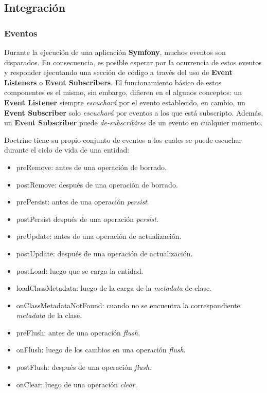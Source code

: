 \subsection{Integración}

\subsubsection{Eventos}%
\label{ssub:eventos}


Durante la ejecución de una aplicación \textbf{Symfony}, muchos eventos son disparados\@. En consecuencia, es posible esperar por la ocurrencia de estos eventos y responder ejecutando
una sección de código a través del uso de \textbf{Event Listeners} o \textbf{Event Subscribers}\@. El funcionamiento básico de estos componentes es el mismo, sin embargo, difieren en
el algunos conceptos: un \textbf{Event Listener} siempre \textit{escuchará} por el evento establecido, en cambio, un \textbf{Event Subscriber} solo \textit{escuchará} por eventos a los
que está subscripto\@. Además, un \textbf{Event Subscriber} puede \textit{de-subscribirse} de un evento en cualquier momento.


Doctrine tiene su propio conjunto de eventos a los cuales se puede escuchar durante el ciclo de vida de una entidad:

\begin{itemize}
    \item preRemove: antes de una operación de borrado.
    \item postRemove: después de una operación de borrado.
    \item prePersist: antes de una operación \textit{persist}.
    \item postPersist después de una operación \textit{persist}.
    \item preUpdate: antes de una operación de actualización.
    \item postUpdate: después de una operación de actualización.
    \item postLoad: luego que se carga la entidad.
    \item loadClassMetadata: luego de la carga de la \textit{metadata} de clase.
    \item onClassMetadataNotFound: cuando no se encuentra la correspondiente \textit{metadata} de la clase.
    \item preFlush: antes de una operación \textit{flush}.
    \item onFlush: luego de los cambios en una operación \textit{flush}.
    \item postFlush: después de una operación \textit{flush}.
    \item onClear: luego de una operación \textit{clear}.
\end{itemize}

